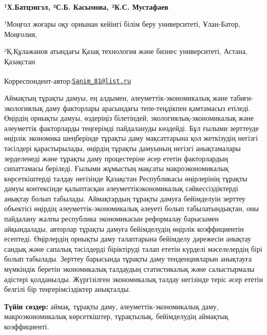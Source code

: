 
\begin{articleheader}

{\bfseries ¹Х.Батцэнгэл\textsuperscript{\envelope }, ²С.Б. Касымова, ²К.С.
Мустафаев}
\end{articleheader}

\begin{affiliation}
¹Моңғол жоғары оқу орнынан кейінгі білім беру университеті, Ұлан-Батор,
Моңғолия,

²Қ.Құлажанов атындағы Қазақ технология және бизнес университеті, Астана,
Қазақстан

\raggedright {\bfseries \textsuperscript{\envelope }}Корреспондент-автор:\href{mailto:Sanim_81@list.ru}{\nolinkurl{Sanim\_81@list.ru}}
\end{affiliation}

Аймақтың тұрақты дамуы, ең алдымен, әлеуметтік-экономикалық және
табиғи-экологиялық даму факторлары арасындағы тепе-теңдікпен қамтамасыз
етіледі. Өңірдің орнықты дамуы, өздеріңіз білетіндей,
экологиялық-экономикалық және әлеуметтік факторларды теңгерімді
пайдалануды көздейді. Бұл ғылыми зерттеуде өңірлік экономика шеңберінде
тұрақты даму мақсаттарына қол жеткізудің негізгі тәсілдері
қарастырылады, өңірдің тұрақты дамуының негізгі анықтамалары зерделенеді
және тұрақты даму процестеріне әсер ететін факторлардың сипаттамасы
беріледі. Ғылыми жұмыстың мақсаты макроэкономикалық көрсеткіштерді
талдау негізінде Қазақстан Республикасы өңірлерінің тұрақты дамуы
контексінде қалыптасқан әлеуметтік\-экономикалық сәйкессіздіктерді
анықтау болып табылады. Аймақтардың тұрақты дамуға бейімделуін зерттеу
объектісі өңірдің әлеуметтік-экономикалық әлеуеті болып табылатындықтан,
оны пайдалану жалпы республика экономикасын реформалау барысымен
айқындалады, авторлар тұрақты дамуға бейімделудің өңірлік коэффициентін
есептеді. Өңірлердің орнықты даму талаптарына бейімделу дәрежесін
анықтау сандық және сапалық тәсілдерді біріктіруді талап ететін күрделі
мәселелердің бірі болып табылады. Зерттеу барысында тұрақты даму
тенденцияларын анықтауға мүмкіндік беретін экономикалық талдаудың
статистикалық және салыстырмалы әдістері қолданылды. Жүргізілген
экономикалық талдау негізінде теріс әсер ететін белгілі бір
теңгерімсіздіктер анықталды.

{\bfseries Түйін сөздер:} аймақ, тұрақты даму, әлеуметтік-экономикалық
даму, макроэкономикалық көрсеткіштер, тұрақтылық, бейімделудің аймақтық
коэффициенті.

